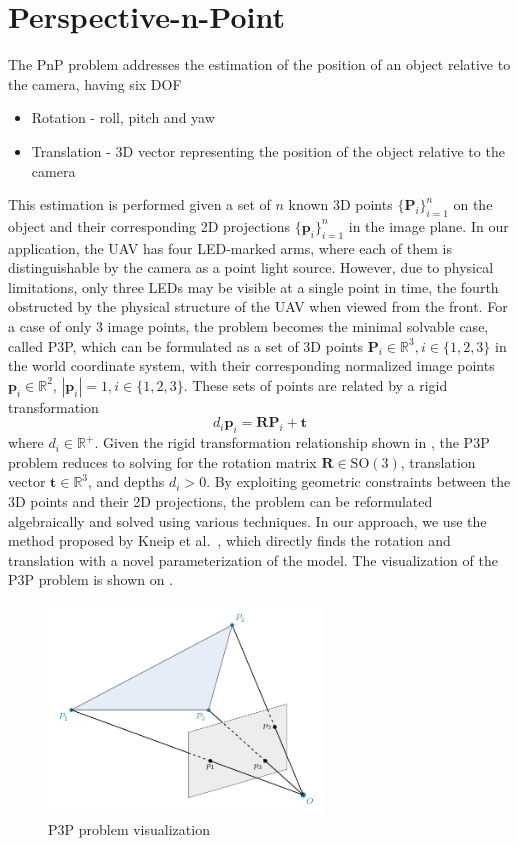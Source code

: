 \section{Perspective-n-Point}
The \ac{PnP} problem addresses the estimation of the position of an object relative to the camera, having six \ac{DOF}
\begin{itemize}
\item{Rotation - roll, pitch and yaw}
\item{Translation - 3D vector representing the position of the object relative to the camera}
\end{itemize}
This estimation is performed given a set of $n$ known 3D points $\{\mathbf{P}_i\}_{i=1}^n$ on the object and their corresponding 2D projections $\{\mathbf{p}_i\}_{i=1}^n$ in the image plane.
In our application, the UAV has four \ac{LED}-marked arms, where each of them is distinguishable by the camera as a point light source.
However, due to physical limitations, only three \ac{LED}s may be visible at a single point in time, the fourth obstructed by the physical structure of the \ac{UAV} when viewed from the front.
For a case of only 3 image points, the problem becomes the minimal solvable case, called \ac{P3P}, which 
can be formulated as a set of 3D points $\textbf{P}_i \in \mathbb{R}^{3}, i \in \{1, 2, 3\}$ in the world coordinate system, with their corresponding normalized image points
$\textbf{p}_i \in \mathbb{R}^{2}$, $|\textbf{p}_i|=1, i \in \{1, 2, 3\}$. These sets of points are related by a rigid transformation~\cite{Ding_2023_CVPR}
\begin{equation}
d_i \textbf{p}_i = \textbf{R} \textbf{P}_i + \textbf{t}
\label{eq:p3p}
\end{equation}
where $d_i \in \mathbb{R}^+$.
Given the rigid transformation relationship shown in , the \ac{P3P} problem reduces to solving for the rotation matrix 
$\mathbf{R} \in \text{SO}(3)$, translation vector $\mathbf{t} \in \mathbb{R}^3$, and depths $d_i > 0$. 
By exploiting geometric constraints between the 3D points and their 2D projections, the problem can be
reformulated algebraically and solved using various techniques. In our approach, we use the method proposed by Kneip et al.~\cite{kneip}, which
directly finds the rotation and translation with a novel parameterization of the model.
The visualization of the \ac{P3P} problem is shown on .
\begin{figure}[H]
	\centering
	\includegraphics[width=0.65\textwidth]{./fig/tikz/p3p.pdf}
	\caption{P3P problem visualization}
	\label{fig:p3p}
\end{figure}
